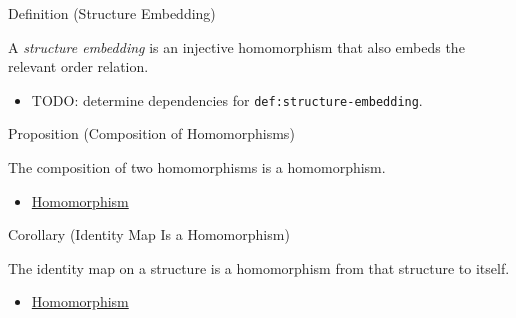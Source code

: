 \begin{definitionbox}{Definition (Structure Embedding)}
\begin{definition}
\label{def:structure-embedding}
A \emph{structure embedding} is an injective homomorphism that also embeds the
relevant order relation.
\end{definition}
\end{definitionbox}

\begin{dependencies}
\begin{itemize}
  \item TODO: determine dependencies for \texttt{def:structure-embedding}.
\end{itemize}
\end{dependencies}

\begin{propositionbox}{Proposition (Composition of Homomorphisms)}
\begin{proposition}
\label{prop:composition-of-homomorphisms}
The composition of two homomorphisms is a homomorphism.
\end{proposition}
\end{propositionbox}

\begin{dependencies}
\begin{itemize}
  \item \hyperref[def:homomorphism]{Homomorphism}
\end{itemize}
\end{dependencies}

\begin{corollarybox}{Corollary (Identity Map Is a Homomorphism)}
\begin{corollary}
\label{cor:identity-map-is-homomorphism}
The identity map on a structure is a homomorphism from that structure to
itself.
\end{corollary}
\end{corollarybox}

\begin{dependencies}
\begin{itemize}
  \item \hyperref[def:homomorphism]{Homomorphism}
\end{itemize}
\end{dependencies}
